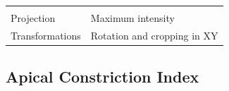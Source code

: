 \documentclass[11pt,singlespacinge,twoside]{reedthesis} %
\begin{document}
\begin{longtable}[]{@{}ll@{}}
\begin{minipage}[t]{0.73\columnwidth}
\strut
\end{minipage}\tabularnewline
\begin{minipage}[t]{0.21\columnwidth}\raggedright
Projection\strut
\end{minipage} & \begin{minipage}[t]{0.73\columnwidth}\raggedright
Maximum intensity\strut
\end{minipage}\tabularnewline
\begin{minipage}[t]{0.21\columnwidth}\raggedright
Transformations\strut
\end{minipage} & \begin{minipage}[t]{0.73\columnwidth}\raggedright
Rotation and cropping in XY\strut
\end{minipage}\tabularnewline
\bottomrule
\end{longtable}
\hypertarget{aci-data}{%
\subsection{Apical Constriction Index}\label{aci-data}}
\end{document}
